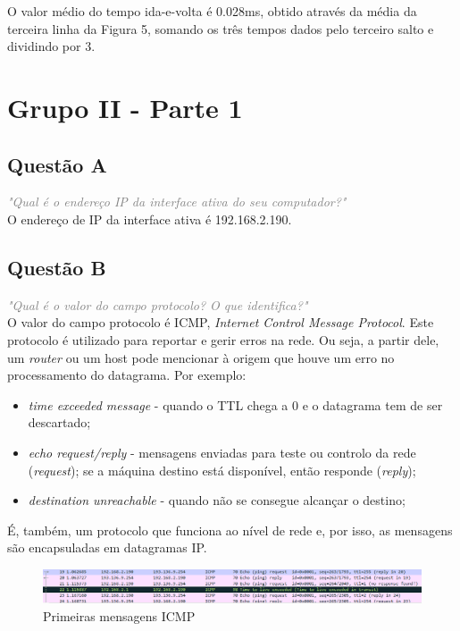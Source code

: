 \documentclass{llncs}
\newcommand{\questionE}[1]{\textcolor{gray}{\textit{"#1"}}}
\begin{document}
O valor médio do tempo ida-e-volta é 0.028ms, obtido através da média da terceira linha da Figura 5, somando os três tempos dados pelo terceiro salto e dividindo por 3.


\clearpage

\section{Grupo II - Parte 1}

\subsection{Questão A}
\hspace{3mm} 
\questionE{Qual é o endereço IP da interface ativa do seu computador?}\\

O endereço de IP da interface ativa é 192.168.2.190.

\subsection{Questão B}
\hspace{3mm}
\questionE{Qual é o valor do campo protocolo? O que identifica?}\\

O valor do campo protocolo é ICMP, \textit{Internet Control Message Protocol}. Este protocolo é utilizado para reportar e gerir erros na rede. Ou seja, a partir dele, um \textit{router} ou um host pode mencionar à origem que houve um erro no processamento do datagrama. Por exemplo: 

\begin{itemize}
    \item \textit{time exceeded message} - quando o TTL chega a 0 e o datagrama tem de ser descartado;
    
    \item \textit{echo request/reply} - mensagens enviadas para teste ou controlo da rede (\textit{request}); se a máquina destino está disponível, então responde (\textit{reply});
    
    \item \textit{destination unreachable} - quando não se consegue alcançar o destino; 
\end{itemize}

É, também, um protocolo que funciona ao nível de rede e, por isso, as mensagens são encapsuladas em datagramas IP.

\begin{figure}[H]
\begin{center}
\includegraphics[width=12cm]{2b.png}
\end{center}
\caption{Primeiras mensagens ICMP}
\end{figure}
\end{document}
